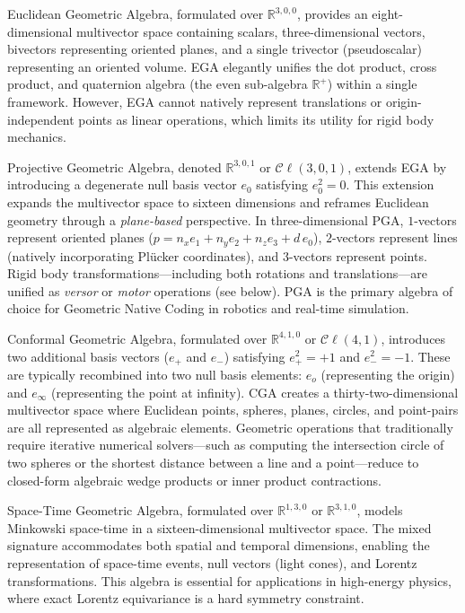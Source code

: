 \documentclass[manuscript, nonacm, review=false]{acmart}
\theoremstyle{definition}
\theoremstyle{plain}
\newcommand{\R}{\mathbb{R}}
\newcommand{\Cl}{\mathcal{C}\!\ell}
\begin{document}
\begin{description}[style=unboxed, leftmargin=0cm, font=\bfseries]
\item[Euclidean Geometric Algebra (EGA)]
Euclidean Geometric Algebra, formulated over $\R^{3,0,0}$, provides an eight-dimensional multivector space containing scalars, three-dimensional vectors, bivectors representing oriented planes, and a single trivector (pseudoscalar) representing an oriented volume. EGA elegantly unifies the dot product, cross product, and quaternion algebra (the even sub-algebra $\R^+$) within a single framework. However, EGA cannot natively represent translations or origin-independent points as linear operations, which limits its utility for rigid body mechanics.

\item[Projective Geometric Algebra (PGA)]
Projective Geometric Algebra, denoted $\R^{3,0,1}$ or $\Cl(3,0,1)$, extends EGA by introducing a degenerate null basis vector $e_0$ satisfying $e_0^2 = 0$. This extension expands the multivector space to sixteen dimensions and reframes Euclidean geometry through a \emph{plane-based} perspective. In three-dimensional PGA, $1$-vectors represent oriented planes ($p = n_x e_1 + n_y e_2 + n_z e_3 + d\, e_0$), $2$-vectors represent lines (natively incorporating Pl\"ucker coordinates), and $3$-vectors represent points. Rigid body transformations---including both rotations and translations---are unified as \emph{versor} or \emph{motor} operations (see below). PGA is the primary algebra of choice for Geometric Native Coding in robotics and real-time simulation.

\item[Conformal Geometric Algebra (CGA)]
Conformal Geometric Algebra, formulated over $\R^{4,1,0}$ or $\Cl(4,1)$, introduces two additional basis vectors ($e_+$ and $e_-$) satisfying $e_+^2 = +1$ and $e_-^2 = -1$. These are typically recombined into two null basis elements: $e_o$ (representing the origin) and $e_\infty$ (representing the point at infinity). CGA creates a thirty-two-dimensional multivector space where Euclidean points, spheres, planes, circles, and point-pairs are all represented as algebraic elements. Geometric operations that traditionally require iterative numerical solvers---such as computing the intersection circle of two spheres or the shortest distance between a line and a point---reduce to closed-form algebraic wedge products or inner product contractions.

\item[Space-Time Geometric Algebra (STGA)]
Space-Time Geometric Algebra, formulated over $\R^{1,3,0}$ or $\R^{3,1,0}$, models Minkowski space-time in a sixteen-dimensional multivector space. The mixed signature accommodates both spatial and temporal dimensions, enabling the representation of space-time events, null vectors (light cones), and Lorentz transformations. This algebra is essential for applications in high-energy physics, where exact Lorentz equivariance is a hard symmetry constraint.


\end{description}
\end{document}
